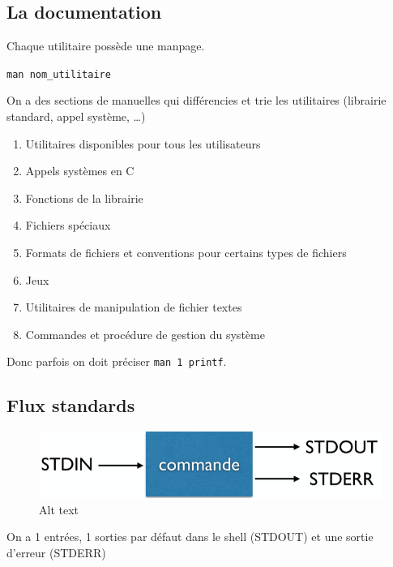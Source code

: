\subsection{La documentation}\label{la-documentation}

Chaque utilitaire possède une manpage.

\texttt{man\ nom\_utilitaire}

On a des sections de manuelles qui différencies et trie les utilitaires
(librairie standard, appel système, \ldots)

\begin{enumerate}
\def\labelenumi{\arabic{enumi}.}
\tightlist
\item
  Utilitaires disponibles pour tous les utilisateurs
\item
  Appels systèmes en C
\item
  Fonctions de la librairie
\item
  Fichiers spéciaux
\item
  Formats de fichiers et conventions pour certains types de fichiers
\item
  Jeux
\item
  Utilitaires de manipulation de fichier textes
\item
  Commandes et procédure de gestion du système
\end{enumerate}

Donc parfois on doit préciser \texttt{man\ 1\ printf}.

\subsection{Flux standards}\label{flux-standards}

\begin{figure}
\centering
\includegraphics{image-4.png}
\caption{Alt text}
\end{figure}

On a 1 entrées, 1 sorties par défaut dans le shell (STDOUT) et une
sortie d'erreur (STDERR)

